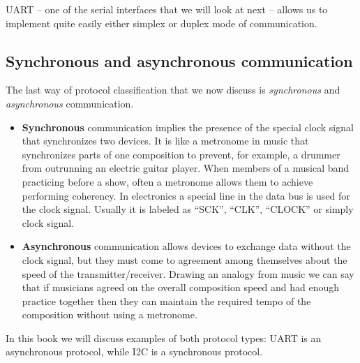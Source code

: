\documentclass[../sparc.tex]{subfiles}
\begin{document}
\gls{UART} -- one of the serial interfaces that we will look at next -- allows us
to implement quite easily either simplex or duplex mode of communication.

\subsection{Synchronous and asynchronous communication}

The last way of protocol classification that we now discuss is
\emph{synchronous} and \emph{asynchronous} communication.

\begin{itemize}
\item \textbf{Synchronous} communication implies the presence of the special
  clock signal that synchronizes two devices.  It is like a metronome in music
  that synchronizes parts of one composition to prevent, for example, a drummer
  from outrunning an electric guitar player.  When members of a musical band
  practicing before a show, often a metronome allows them to achieve performing
  coherency.  In electronics a special line in the data bus is used for the
  clock signal.  Usually it is labeled as ``SCK'', ``CLK'', ``CLOCK'' or simply
  clock signal.
\item \textbf{Asynchronous} communication allows devices to exchange data
  without the clock signal, but they must come to agreement among themselves
  about the speed of the transmitter/receiver.  Drawing an analogy from music we
  can say that if musicians agreed on the overall composition speed and had
  enough practice together then they can maintain the required tempo of the
  composition without using a metronome.
\end{itemize}

In this book we will discuss examples of both protocol types: \gls{UART} is an
asynchronous protocol, while \gls{I2C} is a synchronous protocol.

\end{document}
